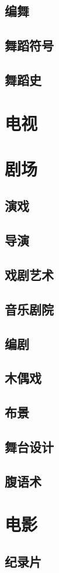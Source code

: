 \documentclass[UTF8]{../RepresentationUniverse}
\begin{document}
\section{编舞}
\section{舞蹈符号}
\section{舞蹈史}

\chapter{电视}


\chapter{剧场}
\section{演戏}
\section{导演}
\section{戏剧艺术}
\section{音乐剧院}
\section{编剧}
\section{木偶戏}
\section{布景}
\section{舞台设计}
\section{腹语术}


\chapter{电影}


\section{纪录片}
\end{document}
